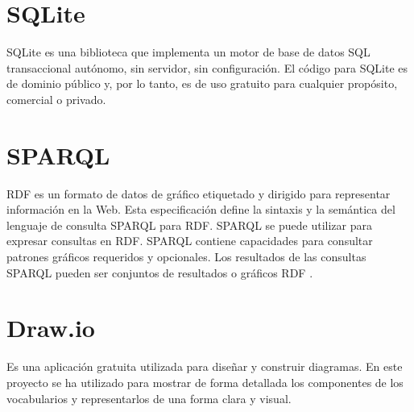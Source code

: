 \section{SQLite}
SQLite es una biblioteca que implementa un motor de base de datos SQL transaccional autónomo, sin servidor, sin configuración. El código para SQLite es de dominio público y, por lo tanto, es de uso gratuito para cualquier propósito, comercial o privado\cite{descripcionSQLite}.

\section{SPARQL}
RDF es un formato de datos de gráfico etiquetado y dirigido para representar información en la Web. Esta especificación define la sintaxis y la semántica del lenguaje de consulta SPARQL para RDF. SPARQL se puede utilizar para expresar consultas en RDF. SPARQL contiene capacidades para consultar patrones gráficos requeridos y opcionales. Los resultados de las consultas SPARQL pueden ser conjuntos de resultados o gráficos RDF \cite{sparqlDescription}.

\section{Draw.io}
Es una aplicación gratuita utilizada para diseñar y construir diagramas. En este proyecto se ha utilizado para mostrar de forma detallada los componentes de los vocabularios y representarlos de una forma clara y visual.
